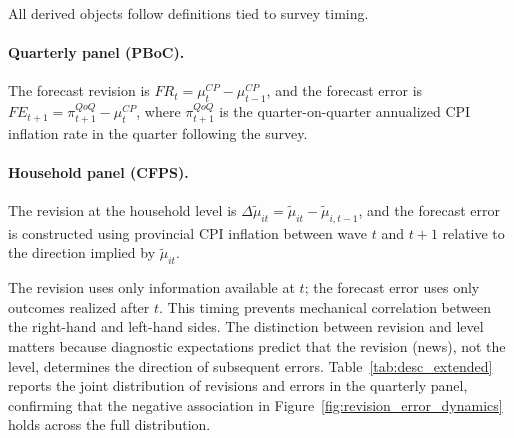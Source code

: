 All derived objects follow definitions tied to survey
timing.

\paragraph{Quarterly panel (PBoC).}
The forecast revision is $FR_t = \mu_t^{CP} - \mu_{t-1}^{CP}$,
and the forecast error is $FE_{t+1} = \pi_{t+1}^{QoQ} - \mu_t^{CP}$,
where $\pi_{t+1}^{QoQ}$ is the quarter-on-quarter annualized CPI
inflation rate in the quarter following the survey.

\paragraph{Household panel (CFPS).}
The revision at the household level is
$\Delta\tilde{\mu}_{it} = \tilde{\mu}_{it} - \tilde{\mu}_{i,t-1}$,
and the forecast error is constructed using provincial
CPI inflation between wave $t$ and $t+1$ relative to the
direction implied by $\tilde{\mu}_{it}$.

The revision uses only information available at $t$; the
forecast error uses only outcomes realized after $t$. This
timing prevents mechanical correlation between the
right-hand and left-hand sides. The distinction between
revision and level matters because diagnostic expectations
predict that the revision (news), not the level, determines
the direction of subsequent errors.
Table~\ref{tab:desc_extended} reports the joint
distribution of revisions and errors in the quarterly
panel, confirming that the negative association in
Figure~\ref{fig:revision_error_dynamics} holds across the
full distribution.






